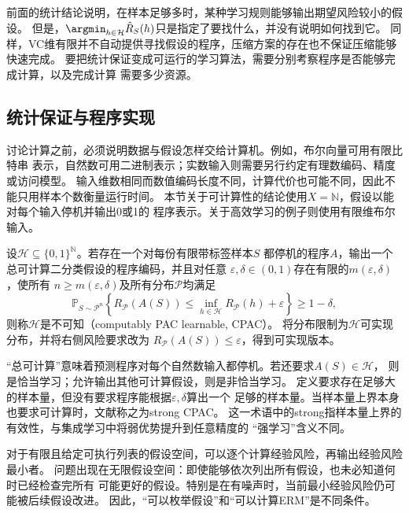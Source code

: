 前面的统计结论说明，在样本足够多时，某种学习规则能够输出期望风险较小的假设。
但是，$\argmin_{h\in\mathcal H}\hat R_S(h)$只是指定了要找什么，并没有说明如何找到它。
同样，VC维有限并不自动提供寻找假设的程序，压缩方案的存在也不保证压缩能够快速完成。
要把统计保证变成可运行的学习算法，需要分别考察程序是否能够完成计算，以及完成计算
需要多少资源。

\subsection{统计保证与程序实现}

讨论计算之前，必须说明数据与假设怎样交给计算机。例如，布尔向量可用有限比特串
表示，自然数可用二进制表示；实数输入则需要另行约定有理数编码、精度或访问模型。
输入维数相同而数值编码长度不同，计算代价也可能不同，因此不能只用样本个数衡量运行时间。
本节关于可计算性的结论使用$X=\mathbb N$，假设以能对每个输入停机并输出0或1的
程序表示。关于高效学习的例子则使用有限维布尔输入。

\begin{definition}[可计算PAC学习]
\label{def:binary-computable-pac}
设$\mathcal H\subseteq\{0,1\}^{\mathbb N}$。若存在一个对每份有限带标签样本$S$
都停机的程序$A$，输出一个总可计算二分类假设的程序编码，并且对任意
$\varepsilon,\delta\in(0,1)$存在有限的$m(\varepsilon,\delta)$，使所有
$n\geq m(\varepsilon,\delta)$及所有分布$\mathcal P$均满足
\[
 \mathbb P_{S\sim\mathcal P^n}\left\{
 R_{\mathcal P}(A(S))\leq\inf_{h\in\mathcal H}R_{\mathcal P}(h)+\varepsilon
 \right\}\geq1-\delta,
\]
则称$\mathcal H$是不可知（computably PAC learnable, CPAC）。
将分布限制为$\mathcal H$可实现分布，并将右侧风险要求改为
$R_{\mathcal P}(A(S))\leq\varepsilon$，得到可实现版本。
\end{definition}

“总可计算”意味着预测程序对每个自然数输入都停机。若还要求$A(S)\in\mathcal H$，
则是恰当学习；允许输出其他可计算假设，则是非恰当学习。
定义要求存在足够大的样本量，但没有要求程序能根据$\varepsilon,\delta$算出一个
足够的样本量。当样本量上界本身也要求可计算时，文献称之为strong CPAC。
这一术语中的strong指样本量上界的有效性，与集成学习中将弱优势提升到任意精度的
“强学习”含义不同。

对于有限且给定可执行列表的假设空间，可以逐个计算经验风险，再输出经验风险最小者。
问题出现在无限假设空间：即使能够依次列出所有假设，也未必知道何时已经检查完所有
可能更好的假设。特别是在有噪声时，当前最小经验风险仍可能被后续假设改进。
因此，“可以枚举假设”和“可以计算ERM”是不同条件。

